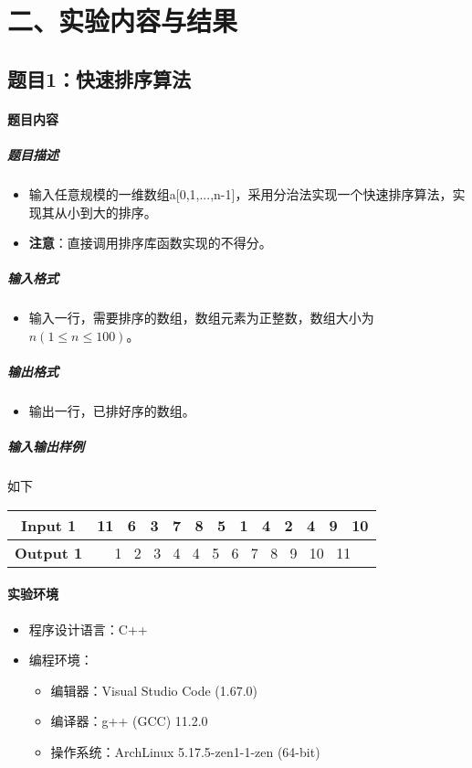 \documentclass[12pt,a4paper]{ctexart}
\begin{document}
\vspace{5pt}

\section*{二、实验内容与结果}
\subsection*{题目1：快速排序算法}
\paragraph{题目内容}
\subparagraph{题目描述}
\begin{itemize}
    \item 输入任意规模的一维数组a[0,1,...,n-1]，采用分治法实现一个快速排序算法，实现其从小到大的排序。
    \item \textbf{注意}：直接调用排序库函数实现的不得分。
\end{itemize}

\subparagraph{输入格式}
    \begin{itemize}
        \item 输入一行，需要排序的数组，数组元素为正整数，数组大小为$n(1 \leq n \leq 100)$。
    \end{itemize}
\subparagraph{输出格式}
    \begin{itemize}
        \item 输出一行，已排好序的数组。
    \end{itemize}

\subparagraph{输入输出样例}
如下
\begin{table}[htb]   
    \begin{center}   
    \begin{tabular}{|c|c|}   
    \hline   \textbf{Input 1} &11 \ 6 \ 3 \ 7 \ 8 \ 5 \ 1 \ 4 \ 2 \ 4 \ 9 \ 10 \\   
    \hline   \textbf{Output 1} &1 \ 2 \ 3 \ 4 \ 4 \ 5 \ 6 \ 7 \ 8 \ 9 \ 10 \ 11  \\ 
    \hline   
    \end{tabular}   
    \end{center}   
\end{table}

\vspace{5pt}

\paragraph{实验环境}
\begin{itemize}
    \item 程序设计语言：C++
    \item 编程环境：
    \begin{itemize}
        \item 编辑器：Visual Studio Code (1.67.0)
        \item 编译器：g++ (GCC) 11.2.0
        \item 操作系统：ArchLinux 5.17.5-zen1-1-zen (64-bit)
    \end{itemize}
\end{itemize}
\end{document}
